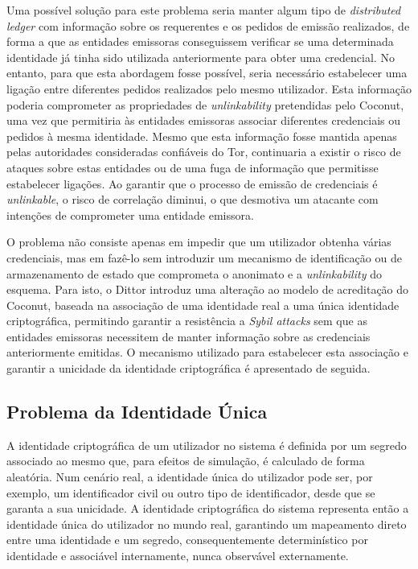 Uma possível solução para este problema seria manter algum tipo de \textit{distributed ledger} com informação sobre os requerentes e os pedidos de emissão realizados, de forma a que as entidades emissoras conseguissem verificar se uma determinada identidade já tinha sido utilizada anteriormente para obter uma credencial. No entanto, para que esta abordagem fosse possível, seria necessário estabelecer uma ligação entre diferentes pedidos realizados pelo mesmo utilizador. Esta informação poderia comprometer as propriedades de \textit{unlinkability} pretendidas pelo Coconut, uma vez que permitiria às entidades emissoras associar diferentes credenciais ou pedidos à mesma identidade. Mesmo que esta informação fosse mantida apenas pelas autoridades consideradas confiáveis do Tor, continuaria a existir o risco de ataques sobre estas entidades ou de uma fuga de informação que permitisse estabelecer ligações. Ao garantir que o processo de emissão de credenciais é \textit{unlinkable}, o risco de correlação diminui, o que desmotiva um atacante com intenções de comprometer uma entidade emissora.

O problema não consiste apenas em impedir que um utilizador obtenha várias credenciais, mas em fazê-lo sem introduzir um mecanismo de identificação ou de armazenamento de estado que comprometa o anonimato e a \textit{unlinkability} do esquema. Para isto, o Dittor introduz uma alteração ao modelo de acreditação do Coconut, baseada na associação de uma identidade real a uma única identidade criptográfica, permitindo garantir a resistência a \textit{Sybil attacks} sem que as entidades emissoras necessitem de manter informação sobre as credenciais anteriormente emitidas. O mecanismo utilizado para estabelecer esta associação e garantir a unicidade da identidade criptográfica é apresentado de seguida.

\subsection{Problema da Identidade Única}
\label{sub:dittor_problema_identidade_unica}

A identidade criptográfica de um utilizador no sistema é definida por um segredo associado ao mesmo que, para efeitos de simulação, é calculado de forma aleatória. Num cenário real, a identidade única do utilizador pode ser, por exemplo, um identificador civil ou outro tipo de identificador, desde que se garanta a sua unicidade. A identidade criptográfica do sistema representa então a identidade única do utilizador no mundo real, garantindo um mapeamento direto entre uma identidade e um segredo, consequentemente determinístico por identidade e associável internamente, nunca observável externamente.

